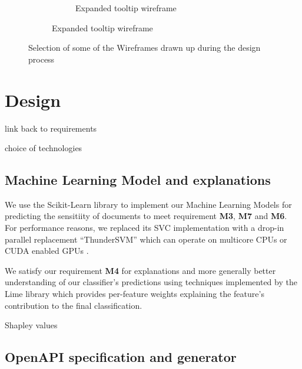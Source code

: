 \documentclass[\version]{l4proj}
\begin{document}
\begin{figure}[H]
\begin{subfigure}[b]{\linewidth}
\begin{subfigure}[b]{0.4\linewidth}
            \caption{Expanded tooltip wireframe}\label{fig:expanded-tooltip-wireframe}
        \end{subfigure}
    \end{subfigure}
    \caption{Selection of some of the Wireframes drawn up during the design process}\label{fig:wireframes}

\end{figure}


\chapter{Design}

link back to requirements

choice of technologies

\section{Machine Learning Model and explanations}


We use the Scikit-Learn library to implement our Machine Learning Models \autocite{pedregosaScikitlearnMachineLearning2011} for predicting the sensitiity of documents to meet requirement \textbf{M3}, \textbf{M7} and \textbf{M6}. For performance reasons, we replaced its SVC implementation with a drop-in parallel replacement ``ThunderSVM'' which can operate on multicore CPUs or CUDA enabled GPUs \autocite{wenThunderSVMFastSVM2018}.

We satisfy our requirement \textbf{M4} for explanations and more generally better understanding of our classifier's predictions using techniques implemented by the Lime library \autocite{ribeiroWhyShouldTrust2016} which provides per-feature weights explaining the feature's contribution to the final classification.

\autocite{lundbergUnifiedApproachInterpreting2017} Shapley values


\section{OpenAPI specification and generator}
\end{document}
